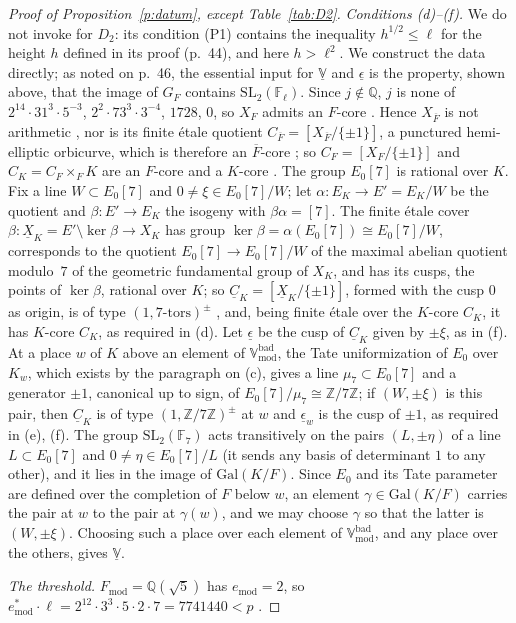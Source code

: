 \documentclass[11pt]{amsart}
\theoremstyle{remark}
\newcommand{\Q}{\mathbb Q}
\newcommand{\Z}{\mathbb Z}
\newcommand{\F}{\mathbb F}
\newcommand{\Fmod}{F_{\mathrm{mod}}}
\newcommand{\VV}{\underline{\mathbb V}}
\newcommand{\Vbadmod}{\mathbb V^{\mathrm{bad}}_{\mathrm{mod}}}
\begin{document}
\begin{proof}[Proof of Proposition~\ref{p:datum}, except Table~\ref{tab:D2}]
\emph{Conditions (d)--(f).} We do not invoke \cite[Cor.~2.2]{IUT4} for $D_2$: its condition (P1)
\cite[p.~45]{IUT4} contains the inequality $h^{1/2}\le\ell$ for the height $h$ defined in its proof (p.~44), and here
$h>\ell^2$. We construct the data directly; as noted on p.~46, the essential input for $\VV$ and
$\underline\epsilon$ is the property, shown above, that the image of $G_F$ contains $\mathrm{SL}_2(\F_\ell)$. Since
$j\notin\Q$, $j$ is none of $2^{14}\cdot31^{3}\cdot5^{-3}$, $2^{2}\cdot73^{3}\cdot3^{-4}$, $1728$, $0$, so $X_F$ admits an
$F$-core \cite[Prop.~2.1]{MFHMP}. Hence $X_{\overline F}$ is not arithmetic \cite[Prop.~2.3(i)]{CanLift}, nor is its
finite \'etale quotient $C_{\overline F}=[X_{\overline F}/\{\pm1\}]$, a punctured hemi-elliptic orbicurve, which is
therefore an $\overline F$-core \cite[Prop.~2.7]{CanLift}; so $C_F=[X_F/\{\pm1\}]$ and $C_K=C_F\times_FK$ are an
$F$-core and a $K$-core \cite[Prop.~2.3(i)]{CanLift}. The group $E_0[7]$ is rational over $K$. Fix a line
$W\subset E_0[7]$ and $0\ne\xi\in E_0[7]/W$; let $\alpha\colon E_K\to E'=E_K/W$ be the quotient and
$\beta\colon E'\to E_K$ the isogeny with $\beta\alpha=[7]$. The finite \'etale cover
$\beta\colon\underline X_K=E'\setminus\ker\beta\to X_K$ has group $\ker\beta=\alpha(E_0[7])\cong E_0[7]/W$,
corresponds to the quotient $E_0[7]\to E_0[7]/W$ of the maximal abelian quotient modulo~$7$ of the geometric
fundamental group of $X_K$, and has its cusps, the points of $\ker\beta$, rational over $K$; so
$\underline C_K=[\underline X_K/\{\pm1\}]$, formed with the cusp $0$ as origin, is of type $(1,7\text{-tors})^{\pm}$
\cite[Def.~2.1]{EtTh}, and, being finite \'etale over the $K$-core $C_K$, it has $K$-core $C_K$, as required in (d).
Let $\underline\epsilon$ be the cusp of $\underline C_K$ given by $\pm\xi$, as in (f). At a place $w$ of $K$ above an
element of $\Vbadmod$, the Tate uniformization of $E_0$ over $K_w$, which exists by the paragraph on (c), gives a line
$\mu_7\subset E_0[7]$ and a generator $\pm1$, canonical up to sign, of $E_0[7]/\mu_7\cong\Z/7\Z$; if $(W,\pm\xi)$ is
this pair, then $\underline C_K$ is of type $(1,\Z/7\Z)^{\pm}$ at $w$ \cite[Def.~2.5(i)]{EtTh} and
$\underline\epsilon_w$ is the cusp of $\pm1$, as required in (e), (f). The group $\mathrm{SL}_2(\F_7)$ acts
transitively on the pairs $(L,\pm\eta)$ of a line $L\subset E_0[7]$ and $0\ne\eta\in E_0[7]/L$ (it sends any basis of
determinant $1$ to any other), and it lies in the image of $\mathrm{Gal}(K/F)$. Since $E_0$ and its Tate parameter are
defined over the completion of $F$ below $w$, an element $\gamma\in\mathrm{Gal}(K/F)$ carries the pair at $w$ to the
pair at $\gamma(w)$, and we may choose $\gamma$ so that the latter is $(W,\pm\xi)$. Choosing such a place over each element of
$\Vbadmod$, and any place over the others, gives $\VV$.

\emph{The threshold.} $\Fmod=\Q(\sqrt5)$ has $e_{\mathrm{mod}}=2$, so
$e^*_{\mathrm{mod}}\cdot\ell=2^{12}\cdot3^3\cdot5\cdot2\cdot7=7741440<p$ \cite[p.~22]{IUT4}.
\end{proof}
\end{document}
